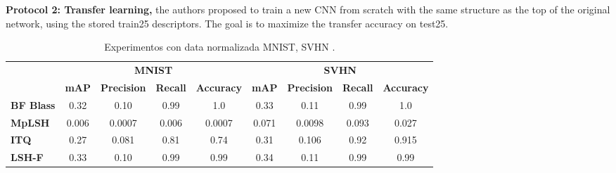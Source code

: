 \documentclass{article}
\begin{document}
\textbf{Protocol 2: Transfer learning, } the authors proposed to train a new CNN from scratch with the same structure as the top of the original network, using the stored train25 descriptors. The goal is to maximize the transfer accuracy on test25.
   
            	
 
 \begin{table}[ht]
\caption{Experimentos con data normalizada MNIST, SVHN . }
\label{table:map}
\centering
\begin{footnotesize}
\begin{tabular}{l|c|c|c|c|c|c|c|c|}
\cline{2-9}
                                           & \multicolumn{4}{c|}{\textbf{MNIST}}             & \multicolumn{4}{c|}{\textbf{SVHN}}         \\ \cline{2-9} 
                                           & \textbf{mAP} & \textbf{Precision} & \textbf{Recall} & \textbf{Accuracy} & \textbf{mAP} & \textbf{Precision} & \textbf{Recall} & \textbf{Accuracy}  \\ \hline
\multicolumn{1}{|l|}{\textbf{BF Blass  \cite{multiprobe}}}       & 0.32         & 0.10            & 0.99    & 1.0      & 0.33         & 0.11            & 0.99  & 1.0     \\ \hline
\multicolumn{1}{|l|}{\textbf{MpLSH \cite{itq}}}         &  0.006         & 0.0007            & 0.006    & 0.0007   & 0.071        & 0.0098            & 0.093   & 0.027    \\ \hline
\multicolumn{1}{|l|}{\textbf{ITQ \cite{lopq}}}        & 0.27         & 0.081            & 0.81    & 0.74    & 0.31         & 0.106            & 0.92   & 0.915      \\ \hline
\multicolumn{1}{|l|}{\textbf{LSH-F \cite{lshforest}}}       &  0.33         & 0.10            & 0.99 & 0.99       & 0.34         & 0.11            & 0.99    & 0.99    \\ \hline
\end{tabular}
\end{footnotesize}
\end{table}
\end{document}
